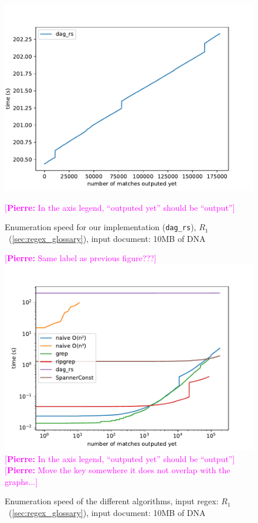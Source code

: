 \documentclass[12px]{article}
\theoremstyle{definition}
\newcommand{\pierre}[1]{\textcolor{magenta}{[\textbf{Pierre:} #1]}}
\begin{document}
      \begin{figure}%
        \caption{
          Enumeration speed for our implementation (\texttt{dag\_rs}),
          $R_1$~(\ref{sec:regex_glossary}), input document: 10MB of DNA }
        \center\includegraphics[width=5in]{figures/bench_enum_only}

        \pierre{In the axis legend, ``outputed yet'' should be
        ``output''}
      \end{figure}

      \begin{figure}%
        \caption{
          Enumeration speed of the different algorithms, input regex:
          $R_1$~(\ref{sec:regex_glossary}), input document: 10MB of DNA
        }
        \label{fig:bench} \pierre{Same label as previous figure???}
        \center\includegraphics[width=5in]{figures/bench}
        \pierre{In the axis legend, ``outputed yet'' should be
        ``output''}
        \pierre{Move the key somewhere it does not overlap with the
        graphs...}
      \end{figure}
\end{document}
